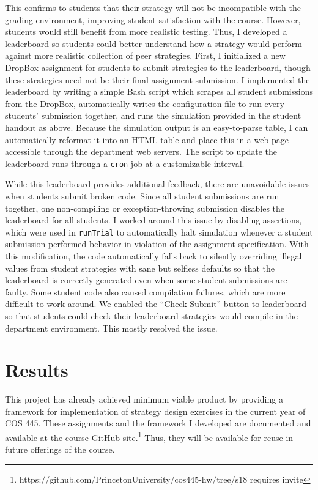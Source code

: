 \documentclass[pageno]{jpaper}
\begin{document}
This confirms to students that their strategy will not be incompatible with the grading environment, improving student satisfaction with the course.
However, students would still benefit from more realistic testing.
Thus, I developed a leaderboard so students could better understand how a strategy would perform against more realistic collection of peer strategies.
First, I initialized a new DropBox assignment for students to submit strategies to the leaderboard, though these strategies need not be their final assignment submission.
I implemented the leaderboard by writing a simple Bash script which scrapes all student submissions from the DropBox, automatically writes the configuration file to run every students' submission together, and runs the simulation provided in the student handout as above.
Because the simulation output is an easy-to-parse table, I can automatically reformat it into an HTML table and place this in a web page accessible through the department web servers.
The script to update the leaderboard runs through a \texttt{cron} job at a customizable interval.

While this leaderboard provides additional feedback, there are unavoidable issues when students submit broken code.
Since all student submissions are run together, one non-compiling or exception-throwing submission disables the leaderboard for all students.
I worked around this issue by disabling assertions, which were used in \texttt{runTrial} to automatically halt simulation whenever a student submission performed behavior in violation of the assignment specification.
With this modification, the code automatically falls back to silently overriding illegal values from student strategies with sane but selfless defaults so that the leaderboard is correctly generated even when some student submissions are faulty.
Some student code also caused compilation failures, which are more difficult to work around.
We enabled the ``Check Submit'' button to leaderboard so that students could check their leaderboard strategies would compile in the department environment.
This mostly resolved the issue.

\section*{Results}
This project has already achieved minimum viable product by providing a framework for implementation of strategy design exercises in the current year of COS 445.
These assignments and the framework I developed are documented and available at the course GitHub site.\footnote{https://github.com/PrincetonUniversity/cos445-hw/tree/s18 requires invite}
Thus, they will be available for reuse in future offerings of the course.
\end{document}
